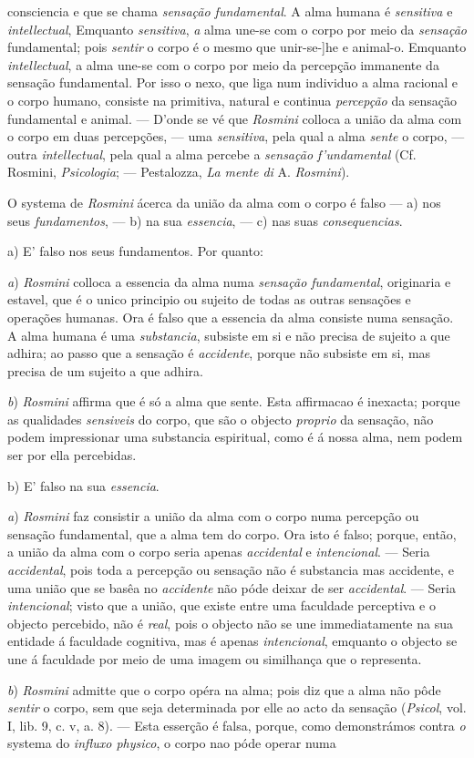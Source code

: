 consciencia e que se chama \emph{sensação fundamental}. A alma humana é \emph{sensitiva} e \emph{intellectual}, Emquanto \emph{sensitiva}, \emph{a} alma une-se com o corpo por meio da \emph{sensação} fundamental; pois \emph{sentir} o corpo é o mesmo que unir-se-]he e animal-o. Emquanto \emph{intellectual}, a alma une-se com o corpo por meio da percepção immanente da sensação fundamental. Por isso o nexo, que liga num individuo a alma racional e o corpo humano, consiste na primitiva, natural e continua \emph{percepção} da sensação fundamental e animal. --- D'onde se vé que \emph{Rosmini} colloca a união da alma com o corpo em duas percepções, --- uma \emph{sensitiva}, pela qual a alma \emph{sente} o corpo, --- outra \emph{intellectual}, pela qual a alma percebe a \emph{sensação f'undamental} (Cf. Rosmini, \emph{Psicologia}; --- Pestalozza, \emph{La mente di} A. \emph{Rosmini}).\par O systema de \emph{Rosmini} ácerca da união da alma com o corpo é falso --- a) nos seus \emph{fundamentos}, --- b) na sua \emph{essencia}, --- c) nas suas \emph{consequencias}.\par a) E' falso nos seus fundamentos. Por quanto:\par \emph{a}) \emph{Rosmini} colloca a essencia da alma numa \emph{sensação fundamental}, originaria e estavel, que é o unico principio ou sujeito de todas as outras sensações e operações humanas. Ora é falso que a essencia da alma consiste numa sensação. A alma humana é uma \emph{substancia}, subsiste em si e não precisa de sujeito a que adhira; ao passo que a sensação é \emph{accidente}, porque não subsiste em si, mas precisa de um sujeito a que adhira.\par \emph{b}) \emph{Rosmini} affirma que é só a alma que sente. Esta affirmacao é inexacta; porque as qualidades \emph{sensiveis} do corpo, que são o objecto \emph{proprio} da sensação, não podem impressionar uma substancia espiritual, como é á nossa alma, nem podem ser por ella percebidas.\par b) E' falso na sua \emph{essencia}.\par \emph{a}) \emph{Rosmini} faz consistir a união da alma com o corpo numa percepção ou sensação fundamental, que a alma tem do corpo. Ora isto é falso; porque, então, a união da alma com o corpo seria apenas \emph{accidental} e \emph{intencional}. --- Seria \emph{accidental}, pois toda a percepção ou sensação não é substancia mas accidente, e uma união que se basêa no \emph{accidente} não póde deixar de ser \emph{accidental}. --- Seria \emph{intencional}; visto que a união, que existe entre uma faculdade perceptiva e o objecto percebido, não é \emph{real}, pois o objecto não se une immediatamente na sua entidade á faculdade cognitiva, mas é apenas \emph{intencional}, emquanto o objecto se une á faculdade por meio de uma imagem ou similhança que o representa.\par \emph{b}) \emph{Rosmini} admitte que o corpo opéra na alma; pois diz que a alma não pôde \emph{sentir} o corpo, sem que seja determinada por elle ao acto da sensação (\emph{Psicol}, vol. I, lib. 9, c. v, a. 8). --- Esta esserção é falsa, porque, como demonstrámos contra \emph{o} systema do \emph{influxo physico}, o corpo nao póde operar numa 